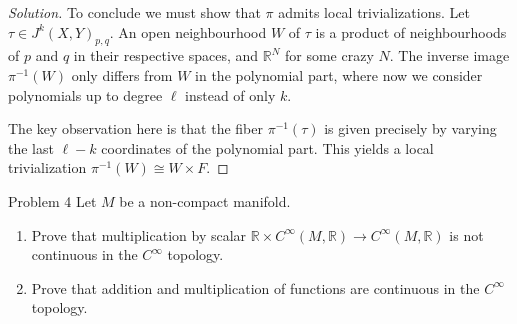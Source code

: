 \begin{proof}[Solution]
To conclude we must show that \(\pi\) admits local trivializations. Let \(\tau \in J^k(X,Y)_{p,q}\). An open neighbourhood \(W\) of \(\tau\) is a product of neighbourhoods of \(p\) and \(q\) in their respective spaces, and \(\mathbb{R}^N\) for some crazy \(N\). The inverse image \(\pi^{-1}(W)\) only differs from \(W\) in the polynomial part, where now we consider polynomials up to degree \(\ell\) instead of only \(k\).

The key observation here is that the fiber \(\pi^{-1}(\tau)\) is given precisely by varying the last \(\ell-k\) coordinates of the polynomial part. This yields a local trivialization \(\pi^{-1}(W) \cong W \times F\).
\iffalse
The 

A diffeomorphism \(\pi^{-1}(W) \cong W \times F\) is given as 
\begin{align*}
	 \pi^{-1}(W) &\longrightarrow W \times F \\
	 (p,q,T_\ell (\sigma)) &\longmapsto (p,q,T_k(\sigma)),
\end{align*}
\fi
\end{proof}

\begin{thing1}{Problem 4}\label{p:4}\leavevmode
Let \(M\) be a non-compact manifold.
\begin{enumerate}[label=(\alph*)]
\item Prove that multiplication by scalar \(\mathbb{R}\times C^\infty (M,\mathbb{R})\to C^\infty (M,\mathbb{R})\) is not continuous in the \(C^\infty \) topology.
\item Prove that addition and multiplication of functions are continuous in the \(C^\infty \) topology.
\end{enumerate}
\end{thing1}

